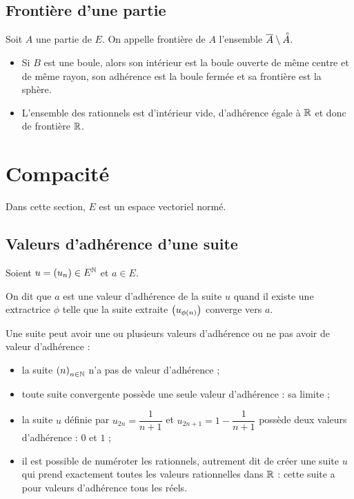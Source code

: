\subsection{Frontière d'une partie}

\begin{defi}
Soit \(A\) une partie de \(E\). On appelle frontière de \(A\) l'ensemble \(\overline{A}\setminus\accentset{\circ}{A}\).
\end{defi}

\begin{ex}
\begin{itemize}
    \item Si \(B\) est une boule, alors son intérieur est la boule ouverte de même centre et de même rayon, son adhérence est la boule fermée et sa frontière est la sphère. \\
    \item L'ensemble des rationnels est d'intérieur vide, d'adhérence égale à \(\mathbb{R}\) et donc de frontière \(\mathbb{R}\).
\end{itemize}
\end{ex}

\section{Compacité}

Dans cette section, \(E\) est un espace vectoriel normé.

\subsection{Valeurs d'adhérence d'une suite}

\begin{defi}
Soient \(u=\left(u_n\right)\in E^{\mathbb{N}}\) et \(a\in E\).

On dit que \(a\) est une valeur d'adhérence de la suite \(u\) quand il existe une extractrice \(\phi\) telle que la suite extraite \(\left(u_{\phi\left(n\right)}\right)\) converge vers \(a\).
\end{defi}

Une suite peut avoir une ou plusieurs valeurs d'adhérence ou ne pas avoir de valeur d'adhérence :

\begin{itemize}
    \item la suite \(\left(n\right)_{n\in\mathbb{N}}\) n'a pas de valeur d'adhérence ; \\
    \item toute suite convergente possède une seule valeur d'adhérence : sa limite ; \\
    \item la suite \(u\) définie par \(u_{2n}=\dfrac{1}{n+1}\) et \(u_{2n+1}=1-\dfrac{1}{n+1}\) possède deux valeurs d'adhérence : \(0\) et \(1\) ; \\
    \item il est possible de numéroter les rationnels, autrement dit de créer une suite \(u\) qui prend exactement toutes les valeurs rationnelles dans \(\mathbb{R}\) : cette suite a pour valeurs d'adhérence tous les réels.
\end{itemize}

